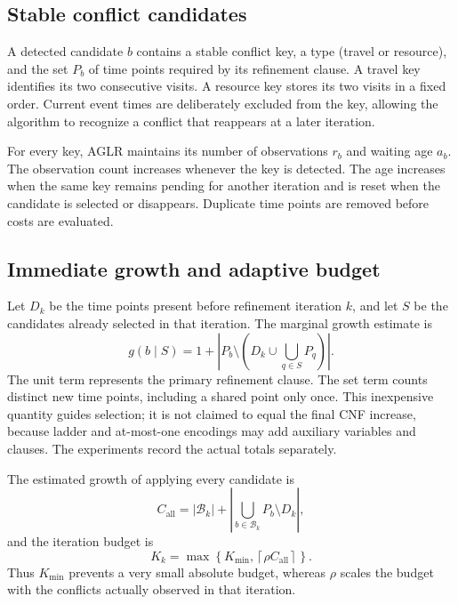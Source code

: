 \documentclass[preprint,12pt,authoryear]{elsarticle}
\begin{document}
\subsection{Stable conflict candidates}

A detected candidate $b$ contains a stable conflict key, a type (travel or
resource), and the set $P_b$ of time points required by its refinement clause.
A travel key identifies its two consecutive visits. A resource key stores its
two visits in a fixed order. Current event times are deliberately excluded from
the key, allowing the algorithm to recognize a conflict that reappears at a
later iteration.

For every key, AGLR maintains its number of observations $r_b$ and waiting age
$a_b$. The observation count increases whenever the key is detected. The age
increases when the same key remains pending for another iteration and is reset
when the candidate is selected or disappears. Duplicate time points are
removed before costs are evaluated.

\subsection{Immediate growth and adaptive budget}

Let $D_k$ be the time points present before refinement iteration $k$, and let
$S$ be the candidates already selected in that iteration. The marginal growth
estimate is
\begin{equation}
g(b\mid S)=1+\left|P_b\setminus
\left(D_k\cup\bigcup_{q\in S}P_q\right)\right|.
\label{eq:aglr-growth}
\end{equation}
The unit term represents the primary refinement clause. The set term counts
distinct new time points, including a shared point only once. This inexpensive
quantity guides selection; it is not claimed to equal the final CNF increase,
because ladder and at-most-one encodings may add auxiliary variables and
clauses. The experiments record the actual totals separately.

The estimated growth of applying every candidate is
\begin{equation}
C_{\mathrm{all}}=|\mathcal B_k|+
\left|\bigcup_{b\in\mathcal B_k}P_b\setminus D_k\right|,
\label{eq:aglr-all-growth}
\end{equation}
and the iteration budget is
\begin{equation}
K_k=\max\left\{K_{\min},\left\lceil\rho C_{\mathrm{all}}\right\rceil\right\}.
\label{eq:aglr-budget}
\end{equation}
Thus $K_{\min}$ prevents a very small absolute budget, whereas $\rho$ scales the
budget with the conflicts actually observed in that iteration.
\end{document}
